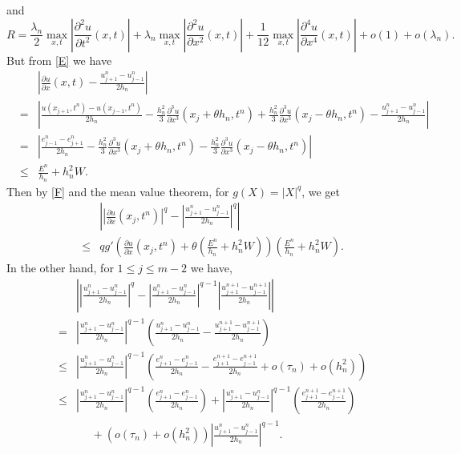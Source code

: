 \documentclass[a4paper,12pt,english,reqno]{smfart}
\begin{document}
	and
	\begin{equation*}
	R=\frac{\lambda_{n}}{2}\max_{x,t}\left|\frac{\partial^{2}u}{\partial t^{2}}(x,t)\right|+\lambda_{n}\max_{x,t}\left|\frac{\partial^{2}u}{\partial x^{2}}(x,t)\right|+\frac{1}{12}\max_{x,t}\left|\frac{\partial^{4}u}{\partial x^{4}}(x,t)\right|+o(1)+o(\lambda_{n}).
	\end{equation*}
	But from \eqref{E} we have
	\begin{eqnarray}
	\nonumber &&\left|\frac{\partial u}{\partial x}(x,t)-\frac{u_{j+1}^{n}-u_{j-1}^{n}}{2h_{n}}\right|\\
	\nonumber &=&\left|\frac{u(x_{j+1},t^{n})-u(x_{j-1},t^{n})}{2h_{n}}-\frac{h_{n}^{2}}{3}\frac{\partial^{3}u}{\partial x^{3}}(x_{j}+\theta h_{n},t^{n})+\frac{h_{n}^{2}}{3}\frac{\partial^{3}u}{\partial x^{3}}(x_{j}-\theta h_{n},t^{n}) -\frac{u_{j+1}^{n}-u_{j-1}^{n}}{2h_{n}}\right|\\
	\nonumber &=&\left|\frac{e_{j-1}^{n}-e_{j+1}^{n}}{2h_{n}}-\frac{h_{n}^{2}}{3}\frac{\partial^{3}u}{\partial x^{3}}(x_{j}+\theta h_{n},t^{n})-\frac{h_{n}^{2}}{3}\frac{\partial^{3}u}{\partial x^{3}}(x_{j}-\theta h_{n},t^{n})\right|\\
	&\leq& \frac{E^{n}}{h_{n}}+h_{n}^{2}W.
	\label{F}
	\end{eqnarray}
	Then by \eqref{F} and the mean value theorem, for $g(X)=\left|X\right|^{q}$, we get
	\begin{eqnarray}
	\nonumber &&\left|\left|\frac{\partial u}{\partial x}(x_{j},t^{n})\right|^{q}-\left|\frac{u_{j+1}^{n}-u_{j-1}^{n}}{2h_{n}}\right|^{q}\right|\\
	&\leq&qg'\left(\frac{\partial u}{\partial x}(x_{j},t^{n})+\theta\left(\frac{E^{n}}{h_{n}}+h_{n}^{2}W\right)\right)\left(\frac{E^{n}}{h_{n}}+h_{n}^{2}W\right).
	\label{H}
	\end{eqnarray}
	In the other hand, for $1\leq j\leq m-2$ we have,
	\begin{eqnarray}
	\nonumber &&\left|\left|\frac{u_{j+1}^{n}-u_{j-1}^{n}}{2h_{n}}\right|^{q}-\left|\frac{u_{j+1}^{n}-u_{j-1}^{n}}{2h_{n}}\right|^{q-1}\left|\frac{u_{j+1}^{n+1}-u_{j-1}^{n+1}}{2h_{n}}\right|\right|\\
	\nonumber &=&\left|\frac{u_{j+1}^{n}-u_{j-1}^{n}}{2h_{n}}\right|^{q-1}\left(\frac{u_{j+1}^{n}-u_{j-1}^{n}}{2h_{n}}-\frac{u_{j+1}^{n+1}-u_{j-1}^{n+1}}{2h_{n}}\right)\\
	\nonumber &\leq&\left|\frac{u_{j+1}^{n}-u_{j-1}^{n}}{2h_{n}}\right|^{q-1}\left(\frac{e_{j+1}^{n}-e_{j-1}^{n}}{2h_{n}}-\frac{e_{j+1}^{n+1}-e_{j-1}^{n+1}}{2h_{n}}+o(\tau_{n})+o(h_{n}^{2})\right)\\
	\nonumber &\leq&\left|\frac{u_{j+1}^{n}-u_{j-1}^{n}}{2h_{n}}\right|^{q-1}\left(\frac{e_{j+1}^{n}-e_{j-1}^{n}}{2h_{n}}\right)+\left|\frac{u_{j+1}^{n}-u_{j-1}^{n}}{2h_{n}}\right|^{q-1}\left(\frac{e_{j+1}^{n+1}-e_{j-1}^{n+1}}{2h_{n}}\right)\\
	&&\ \ \ \ \ \ +\left(o(\tau_{n})+o(h_{n}^{2})\right)\left|\frac{u_{j+1}^{n}-u_{j-1}^{n}}{2h_{n}}\right|^{q-1}.
	\label{G}
	\end{eqnarray}
\end{document}
